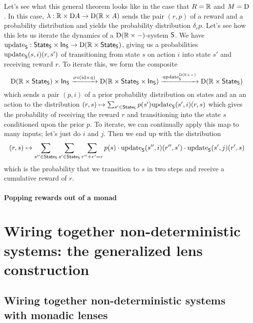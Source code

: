 \documentclass[DynamicalBook]{subfiles}
\begin{document}
\begin{example}
Let's see what this general theorem looks like in the case that $R = \mathbb{R}$ and $M
= \mathrm{D}$. In this case, $\lambda : \mathbb{R} \times \mathrm{D} A \to \mathrm{D} (\mathbb{R} \times A)$
sends the pair $(r, p)$ of a reward and a probability distribution and yields
the probability distribution $\delta_r p$.
Let's see how this lets us iterate the dynamics of a $\mathrm{D}(\mathbb{R}\times
-)$-system $\mathsf{S}$. We have $\mathrm{update}_{\mathsf{S}} : \mathsf{State}_{\mathsf{S}} \times \mathsf{In}_{\mathsf{S}} \to
\mathrm{D}(\mathbb{R} \times \mathsf{State}_{\mathsf{S}})$, giving us a probabilities
$\mathrm{update}_{\mathsf{S}}(s, i)(r, s')$ of transitioning from state $s$ on action $i$ into
state $s'$ and receiving reward $r$. To iterate this, we form the composite
$$\mathrm{D}(\mathbb{R} \times \mathsf{State}_{\mathsf{S}} ) \times \mathsf{In}_{\mathsf{S}}\xrightarrow{\sigma \circ (\mathrm{id} \times \eta)} 
\mathrm{D}(\mathbb{R} \times \mathsf{State}_{\mathsf{S}} \times \mathsf{In}_{\mathsf{S}}) \xrightarrow{\mathrm{update}_{\mathsf{S}}^{\mathrm{D}(\mathbb{R}
    \times -)}} \mathrm{D}(\mathbb{R} \times \mathsf{State}_{\mathsf{S}})$$
which sends a pair $(p, i)$ of a prior probability distribution on states and an
an action to the distribution $(r, s) \mapsto \sum_{s' \in \mathsf{State}_{\mathsf{S}}}p(s')
\mathrm{update}_{\mathsf{S}}(s', i)(r, s)$ which gives the probability of receiving the reward $r$
and transitioning into the state $s$ conditioned upon the prior $p$. To iterate,
we can continually apply this map to many inputs; let's just do $i$ and $j$. Then we end up
with the distribution
\[
(r, s) \mapsto \sum_{s'' \in \mathsf{State}_{\mathsf{S}}}\sum_{s' \in \mathsf{State}_{\mathsf{S}}}\sum_{r'' + r' = r}
p(s)\cdot\mathrm{update}_{\mathsf{S}}(s'', i)(r'', s')\cdot \mathrm{update}_{\mathsf{S}}(s', j)(r', s)
\]
which is the probability that we transition to $s$ in two steps and receive a
cumulative reward of $r$.
\end{example}


\paragraph{Popping rewards out of a monad}





\section{Wiring together non-deterministic systems: the generalized lens construction}


\subsection{Wiring together non-deterministic systems with monadic lenses}
\end{document}
